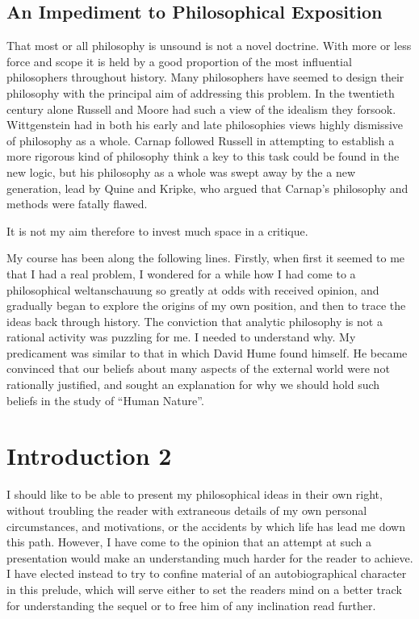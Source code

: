 \section{An Impediment to Philosophical Exposition}

That most or all philosophy is unsound is not a novel doctrine.
With more or less force and scope it is held by a good proportion of the most influential philosophers throughout history.
Many philosophers have seemed to design their philosophy with the principal aim of addressing this problem.
In the twentieth century alone Russell and Moore had such a view of the idealism they forsook.
Wittgenstein had in both his early and late philosophies views highly dismissive of philosophy as a whole.
Carnap followed Russell in attempting to establish a more rigorous kind of philosophy think a key to this task could be found in the new logic, but his philosophy as a whole was swept away by the a new generation, lead by Quine and Kripke, who argued that Carnap's philosophy and methods were fatally flawed.

It is not my aim therefore to invest much space in a critique.

My course has been along the following lines.
Firstly, when first it seemed to me that I had a real problem, I wondered for a while how I had come to a philosophical weltanschauung so greatly at odds with received opinion, and gradually began to explore the origins of my own position, and then to trace the ideas back through history.
The conviction that analytic philosophy is not a rational activity was puzzling for me.
I needed to understand why.
My predicament was similar to that in which David Hume found himself.
He became convinced that our beliefs about many aspects of the external world were not rationally justified, and sought an explanation for why we should hold such beliefs in the study of ``Human Nature''.

\chapter{Introduction 2}

I should like to be able to present my philosophical ideas in their own right, without troubling the reader with extraneous details of my own personal circumstances, and motivations, or the accidents by which life has lead me down this path.
However, I have come to the opinion that an attempt at such a presentation would make an understanding much harder for the reader to achieve.
I have elected instead to try to confine material of an autobiographical character in this prelude, which will serve either to set the readers mind on a better track for understanding the sequel or to free him of any inclination read further.

